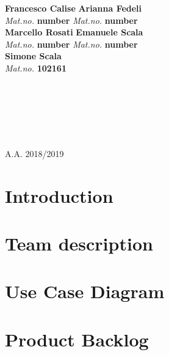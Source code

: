 \documentclass[a4paper,10pt]{report}
\newcommand*{\blankpage}{
\vspace*{\fill}
\vspace{\fill}}
\begin{document}
\begin{titlepage}
\begin{minipage}{0.9\textwidth}
\begin{flushleft} \Large
\textbf{Francesco Calise} \hspace{1.62cm} \textbf{Arianna Fedeli}\\[0.2cm]
\emph{Mat.no.} \textbf{number} \hspace{2.10cm} \emph{Mat.no.}  \textbf{number}\\[0.4cm]
\textbf{Marcello Rosati} \hspace{1.8cm} \textbf{Emanuele Scala}\\[0.2cm]
\emph{Mat.no.} \textbf{number} \hspace{2.10cm} \emph{Mat.no.}  \textbf{number}\\[0.4cm]
\textbf{Simone Scala}\\[0.2cm]
\emph{Mat.no.} \textbf{102161}\\[0.8cm]
\end{flushleft}
\end{minipage}
~
\begin{minipage}{0.01\textwidth}
\begin{flushleft} \Large
\emph{} \\
\textbf{}
\end{flushleft}
\end{minipage}\\[1.5cm]

\HRule \\[0.2cm]
{\Large A.A. 2018/2019}
\vfill 
\end{titlepage}

\newpage
\blankpage
\newpage
{}
\printindex
\tableofcontents
\listoffigures

\newpage
\blankpage

\newpage
\chapter{Introduction}
\chapter{Team description}
\chapter{Use Case Diagram}
\chapter{Product Backlog}
\end{document}
